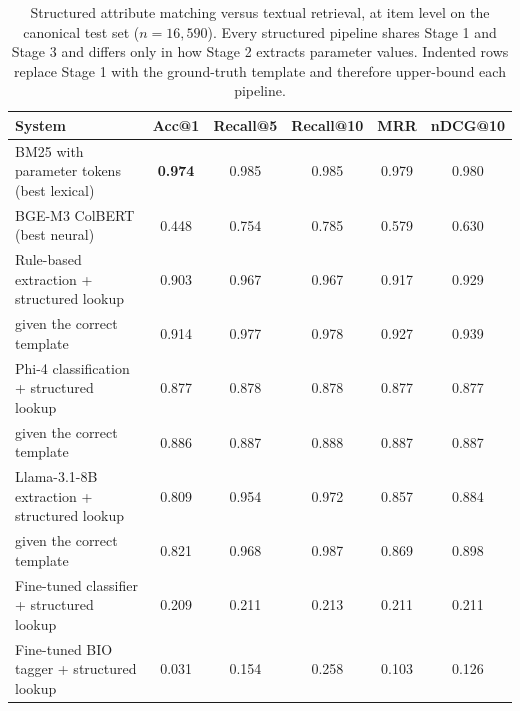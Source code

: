 \begin{table}[ht]
\centering
\caption{Structured attribute matching versus textual retrieval, at item level on the canonical test set ($n=16{,}590$). Every structured pipeline shares Stage 1 and Stage 3 and differs only in how Stage 2 extracts parameter values. Indented rows replace Stage 1 with the ground-truth template and therefore upper-bound each pipeline.}
\label{tab:structured_baselines}
\begin{tabular}{lccccc}
\toprule
\textbf{System} & \textbf{Acc@1} & \textbf{Recall@5} & \textbf{Recall@10} & \textbf{MRR} & \textbf{nDCG@10} \\
\midrule
BM25 with parameter tokens (best lexical) & \textbf{0.974} & 0.985 & 0.985 & 0.979 & 0.980 \\
BGE-M3 ColBERT (best neural) & 0.448 & 0.754 & 0.785 & 0.579 & 0.630 \\
Rule-based extraction + structured lookup & 0.903 & 0.967 & 0.967 & 0.917 & 0.929 \\
\quad given the correct template & 0.914 & 0.977 & 0.978 & 0.927 & 0.939 \\
Phi-4 classification + structured lookup & 0.877 & 0.878 & 0.878 & 0.877 & 0.877 \\
\quad given the correct template & 0.886 & 0.887 & 0.888 & 0.887 & 0.887 \\
Llama-3.1-8B extraction + structured lookup & 0.809 & 0.954 & 0.972 & 0.857 & 0.884 \\
\quad given the correct template & 0.821 & 0.968 & 0.987 & 0.869 & 0.898 \\
Fine-tuned classifier + structured lookup & 0.209 & 0.211 & 0.213 & 0.211 & 0.211 \\
Fine-tuned BIO tagger + structured lookup & 0.031 & 0.154 & 0.258 & 0.103 & 0.126 \\
\bottomrule
\end{tabular}
\end{table}
